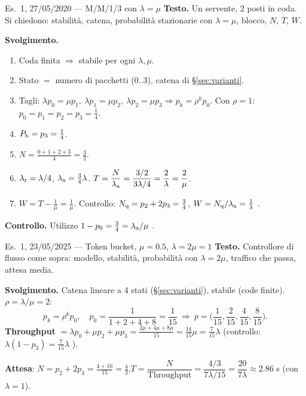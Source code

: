 \begin{esempio}{Es.~1, 27/05/2020 --- M/M/1/3 con $\lambda=\mu$}
\textbf{Testo.} Un servente, 2 posti in coda. Si chiedono: stabilità, catena, probabilità stazionarie con $\lambda=\mu$, blocco, $N$, $T$, $W$.

\textbf{Svolgimento.}
\begin{enumerate}[leftmargin=*,nosep]
\item Coda finita $\Rightarrow$ stabile per ogni $\lambda,\mu$.
\item Stato $=$ numero di pacchetti ($0..3$), catena di §\ref{sec:varianti}.
\item Tagli: $\lambda p_0=\mu p_1,\ \lambda p_1=\mu p_2,\ \lambda p_2=\mu p_3\Rightarrow p_k=\rho^kp_0$. Con $\rho=1$: $p_0=p_1=p_2=p_3=\tfrac14$.
\item $P_{\mathrm{b}}=p_3=\tfrac14$.
\item $N=\tfrac{0+1+2+3}{4}=\tfrac32$.
\item $\lambda_{\mathrm{r}}=\lambda/4$, $\lambda_{\mathrm{a}}=\tfrac34\lambda$. $T=\dfrac{N}{\lambda_{\mathrm{a}}}=\dfrac{3/2}{3\lambda/4}=\dfrac{2}{\lambda}=\dfrac2\mu$.
\item $W=T-\tfrac1\mu=\tfrac1\mu$. Controllo: $N_{\mathrm{q}}=p_2+2p_3=\tfrac34$, $W=N_{\mathrm{q}}/\lambda_{\mathrm{a}}=\tfrac1\lambda$ \checkmark.
\end{enumerate}
\textbf{Controllo.} Utilizzo $1-p_0=\tfrac34=\lambda_{\mathrm{a}}/\mu$ \checkmark.
\end{esempio}

\begin{esempio}{Es.~1, 23/05/2025 --- Token bucket, $\mu=0.5$, $\lambda=2\mu=1$}
\textbf{Testo.} Controllore di flusso come sopra: modello, stabilità, probabilità con $\lambda=2\mu$, traffico che passa, attesa media.

\textbf{Svolgimento.} Catena lineare a 4 stati (§\ref{sec:varianti}), stabile (code finite). $\rho=\lambda/\mu=2$:
\[
p_k=\rho^kp_0,\quad p_0=\frac1{1+2+4+8}=\frac1{15}\ \Rightarrow\ p=\Big(\frac1{15},\frac2{15},\frac4{15},\frac8{15}\Big).
\]
\textbf{Throughput} $=\lambda p_0+\mu p_2+\mu p_3=\tfrac{2\mu+4\mu+8\mu}{15}=\tfrac{14}{15}\mu=\tfrac7{15}\lambda$ (controllo: $\lambda(1-p_3)=\tfrac7{15}\lambda$ \checkmark).

\textbf{Attesa}: $N=p_2+2p_3=\tfrac{4+16}{15}=\tfrac43$,\quad $T=\dfrac{N}{\text{Throughput}}=\dfrac{4/3}{7\lambda/15}=\dfrac{20}{7\lambda}\approx2.86$ s (con $\lambda=1$).
\end{esempio}

